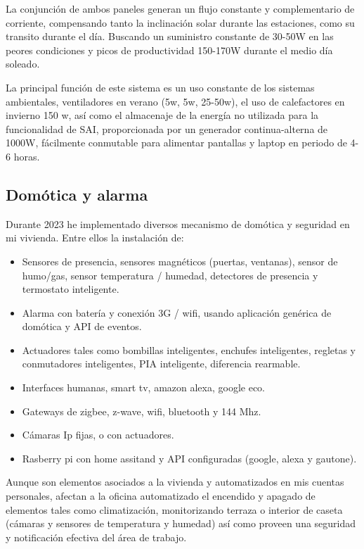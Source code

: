 La conjunción de ambos paneles generan un flujo constante y complementario de corriente, compensando tanto la inclinación solar durante las estaciones, como su transito durante el día. Buscando un suministro constante de 30-50W en las peores condiciones y picos de productividad 150-170W durante el medio día soleado.

La principal función de este sistema es un uso constante de los sistemas ambientales, ventiladores en verano (5w, 5w, 25-50w), el uso de calefactores en invierno 150 w, así como el almacenaje de la energía no utilizada para la funcionalidad de SAI, proporcionada por un generador continua-alterna de 1000W, fácilmente conmutable para alimentar pantallas y laptop en periodo de 4-6 horas.

\subsection{Domótica y alarma}
Durante 2023 he implementado diversos mecanismo de domótica y seguridad en mi vivienda. Entre ellos la instalación de:
\begin{itemize}
    \item Sensores de presencia, sensores magnéticos (puertas, ventanas), sensor de humo/gas, sensor temperatura / humedad, detectores de presencia  y termostato inteligente.
    \item Alarma con batería y conexión 3G / wifi, usando aplicación genérica de domótica y API de eventos.
    \item Actuadores tales como bombillas inteligentes, enchufes inteligentes, regletas y conmutadores inteligentes, PIA inteligente, diferencia rearmable.
    \item Interfaces humanas, smart tv, amazon alexa, google eco.
    \item Gateways de zigbee, z-wave, wifi, bluetooth y 144 Mhz.
    \item Cámaras Ip fijas, o con actuadores.
    \item Rasberry pi con home assitand y API configuradas (google, alexa y gautone).
\end{itemize}

Aunque son elementos asociados a la vivienda y automatizados en mis cuentas personales, afectan a la oficina automatizado el encendido y apagado de elementos tales como climatización, monitorizando terraza o interior de caseta (cámaras y sensores de temperatura y humedad) así como proveen una seguridad y notificación efectiva del área de trabajo.
